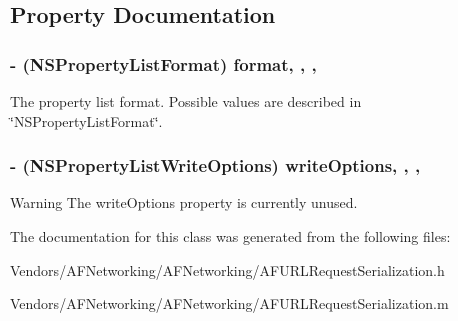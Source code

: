 \subsection{Property Documentation}
\hypertarget{interface_a_f_property_list_request_serializer_a7caf5c4c62553db952c3f8dca8cf5b5f}{}
\subsubsection[{format}]{\setlength{\rightskip}{0pt plus 5cm}-\/ (N\+S\+Property\+List\+Format) format\hspace{0.3cm}{\ttfamily [read]}, {\ttfamily [write]}, {\ttfamily [nonatomic]}, {\ttfamily [assign]}}\label{interface_a_f_property_list_request_serializer_a7caf5c4c62553db952c3f8dca8cf5b5f}
The property list format. Possible values are described in \char`\"{}\+N\+S\+Property\+List\+Format\char`\"{}. \hypertarget{interface_a_f_property_list_request_serializer_a15d74e1c93bc158815a46aa351e6fb79}{}
\subsubsection[{write\+Options}]{\setlength{\rightskip}{0pt plus 5cm}-\/ (N\+S\+Property\+List\+Write\+Options) write\+Options\hspace{0.3cm}{\ttfamily [read]}, {\ttfamily [write]}, {\ttfamily [nonatomic]}, {\ttfamily [assign]}}\label{interface_a_f_property_list_request_serializer_a15d74e1c93bc158815a46aa351e6fb79}
\begin{DoxyWarning}{Warning}
The {\ttfamily write\+Options} property is currently unused. 
\end{DoxyWarning}


The documentation for this class was generated from the following files\+:\begin{DoxyCompactItemize}
\item 
Vendors/\+A\+F\+Networking/\+A\+F\+Networking/A\+F\+U\+R\+L\+Request\+Serialization.\+h\item 
Vendors/\+A\+F\+Networking/\+A\+F\+Networking/A\+F\+U\+R\+L\+Request\+Serialization.\+m\end{DoxyCompactItemize}
